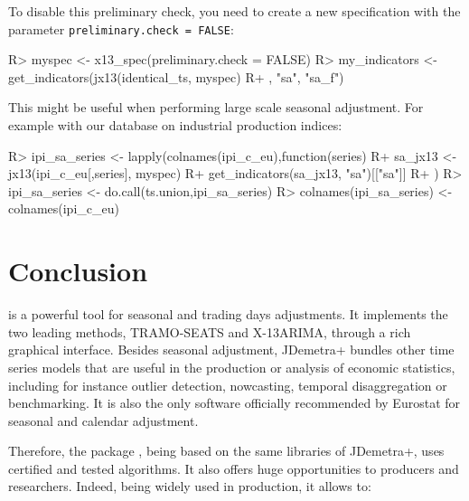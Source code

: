 \documentclass[article]{jss}
\begin{document}
To disable this preliminary check, you need to create a new
specification with the parameter \texttt{preliminary.check\ =\ FALSE}:

\begin{CodeChunk}

\begin{CodeInput}
R> myspec <- x13_spec(preliminary.check = FALSE)
R> my_indicators <- get_indicators(jx13(identical_ts, myspec)
R+                                 , "sa", "sa_f")
\end{CodeInput}
\end{CodeChunk}

This might be useful when performing large scale seasonal adjustment.
For example with our database on industrial production indices:

\begin{CodeChunk}

\begin{CodeInput}
R> ipi_sa_series <- lapply(colnames(ipi_c_eu),function(series){
R+   sa_jx13 <- jx13(ipi_c_eu[,series], myspec)
R+   get_indicators(sa_jx13, "sa")[["sa"]]
R+ })
R> ipi_sa_series <- do.call(ts.union,ipi_sa_series)
R> colnames(ipi_sa_series) <- colnames(ipi_c_eu)
\end{CodeInput}
\end{CodeChunk}

\hypertarget{conclusion}{%
\section{Conclusion}\label{conclusion}}

 is a powerful tool for seasonal and trading days
adjustments. It implements the two leading methods, TRAMO-SEATS and
X-13ARIMA, through a rich graphical interface. Besides seasonal
adjustment, JDemetra+ bundles other time series models that are useful
in the production or analysis of economic statistics, including for
instance outlier detection, nowcasting, temporal disaggregation or
benchmarking. It is also the only software officially recommended by
Eurostat for seasonal and calendar adjustment.

Therefore, the package , being based on the same
libraries of JDemetra+, uses certified and tested algorithms. It also
offers huge opportunities to producers and researchers. Indeed,
 being widely used in production, it allows to:
\end{document}

